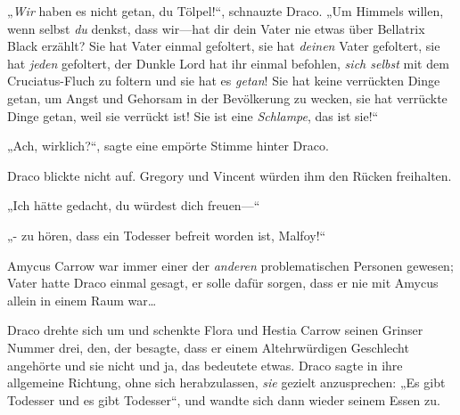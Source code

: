 „\emph{Wir} haben es nicht getan, du Tölpel!“, schnauzte Draco. „Um Himmels willen, wenn selbst \emph{du} denkst, dass wir—hat dir dein Vater nie etwas über Bellatrix Black erzählt? Sie hat Vater einmal gefoltert, sie hat \emph{deinen} Vater gefoltert, sie hat \emph{jeden} gefoltert, der Dunkle Lord hat ihr einmal befohlen, \emph{sich selbst} mit dem Cruciatus-Fluch zu foltern und sie hat es \emph{getan}! Sie hat keine verrückten Dinge getan, um Angst und Gehorsam in der Bevölkerung zu wecken, sie hat verrückte Dinge getan, weil sie verrückt ist! Sie ist eine \emph{Schlampe}, das ist sie!“

„Ach, wirklich?“, sagte eine empörte Stimme hinter Draco.

Draco blickte nicht auf. Gregory und Vincent würden ihm den Rücken freihalten.

„Ich hätte gedacht, du würdest dich freuen—“

„- zu hören, dass ein Todesser befreit worden ist, Malfoy!“

Amycus Carrow war immer einer der \emph{anderen} problematischen Personen gewesen; Vater hatte Draco einmal gesagt, er solle dafür sorgen, dass er nie mit Amycus allein in einem Raum war…

Draco drehte sich um und schenkte Flora und Hestia Carrow seinen Grinser Nummer drei, den, der besagte, dass er einem Altehrwürdigen Geschlecht angehörte und sie nicht und ja, das bedeutete etwas. Draco sagte in ihre allgemeine Richtung, ohne sich herabzulassen, \emph{sie} gezielt anzusprechen: „Es gibt Todesser und es gibt Todesser“, und wandte sich dann wieder seinem Essen zu.

